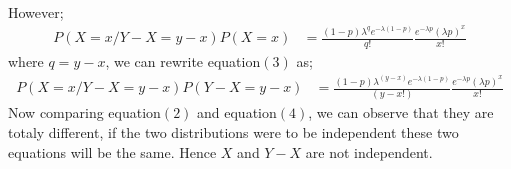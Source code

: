 \documentclass[12pt,a4paper]{article}
\begin{document}
\begin{itemize}
\begin{align}
\end{align}
However;
\begin{align}
P\left(X=x/Y-X=y-x\right)P\left(X=x \right)&=\frac{\left(1-p\right)\lambda^{q}e^{ -\lambda\left(1-p\right)}}{q!} \frac{e^{-\lambda p}\left(\lambda p\right)^{x}}{x!}
\end{align}
where $q=y-x$, we can rewrite equation$\left(3\right)$ as;\\
\begin{align}
P\left(X=x/Y-X=y-x\right)P\left(Y-X=y-x \right)&=\frac{\left(1-p\right)\lambda^{\left( y-x\right)}e^{ -\lambda\left(1-p\right)}}{\left( y-x!\right)} \frac{e^{-\lambda p}\left(\lambda p\right)^{x}}{x!}
\end{align}
Now comparing equation$\left(2\right)$ and equation$\left(4\right)$, we can observe that they are totaly different, if the two distributions were to be independent these two equations will be the same. Hence $X$ and $Y-X$ are not independent.
\newpage
\end{itemize}
\end{document}
